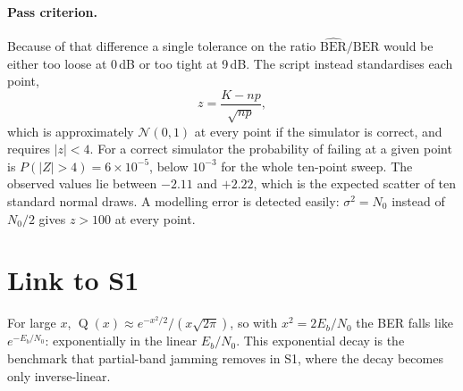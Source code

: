 \documentclass[11pt,a4paper]{article}
\newcommand{\Q}{\operatorname{Q}}
\newcommand{\EbNo}{E_b/N_0}
\begin{document}
\paragraph{Pass criterion.}
Because of that difference a single tolerance on the ratio
$\widehat{\mathrm{BER}}/\mathrm{BER}$ would be either too loose at 0\,dB or too
tight at 9\,dB. The script instead standardises each point,
\begin{equation}
  z = \frac{K - np}{\sqrt{np}},
  \label{eq:z}
\end{equation}
which is approximately $\mathcal N(0,1)$ at every point if the simulator is
correct, and requires $|z|<4$. For a correct simulator the probability of
failing at a given point is $P(|Z|>4) = 6\times10^{-5}$, below $10^{-3}$ for the
whole ten-point sweep. The observed values lie between $-2.11$ and $+2.22$,
which is the expected scatter of ten standard normal draws. A modelling error
is detected easily: $\sigma^2=N_0$ instead of $N_0/2$ gives $z>100$ at every
point.

\section{Link to S1}

For large $x$, $\Q(x) \approx e^{-x^2/2}/(x\sqrt{2\pi})$, so with
$x^2 = 2\EbNo$ the BER falls like $e^{-\EbNo}$: exponentially in the linear
$\EbNo$. This exponential decay is the benchmark that partial-band jamming
removes in S1, where the decay becomes only inverse-linear.
\end{document}
